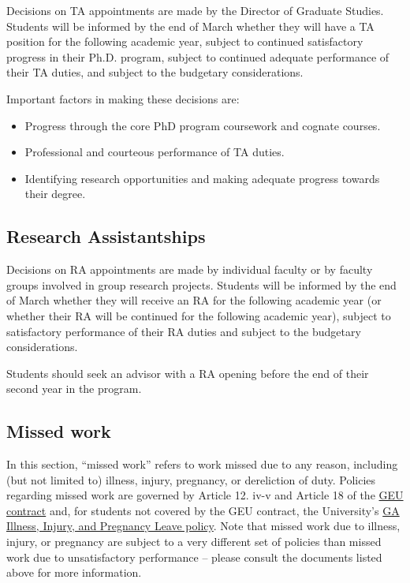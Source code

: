

Decisions on TA appointments are made by the Director of Graduate
Studies.  Students will be informed by the end of March whether they
will have a TA position for the following academic year, subject to
continued satisfactory progress in their Ph.D. program, subject to
continued adequate performance of their TA duties, and subject to the
budgetary considerations.

Important factors in making these decisions are:

\begin{itemize}
\item Progress through the core PhD program coursework and 
cognate courses.
\item Professional and courteous performance of TA duties.
\item Identifying research opportunities and making adequate progress
towards their degree.
\end{itemize}

\subsection{Research Assistantships}

Decisions on RA appointments are made by individual faculty or by
faculty groups involved in group research projects. Students will be
informed by the end of March whether they will receive an RA for the
following academic year (or whether their RA will be continued for
the following academic year), subject to satisfactory performance of
their RA duties and subject to the budgetary considerations.

Students should seek an advisor with a RA opening before the end of
their second year in the program.

\subsection{Missed work}

In this section, ``missed work'' refers to work missed due to any
reason, including (but not limited to) illness, injury, pregnancy, or
dereliction of duty.  Policies regarding missed work are governed by
Article 12. iv-v and Article 18 of the
\href{https://www.hr.msu.edu/documents/contracts/GEU2015-2019.pdf}{GEU
contract} and, for students not covered by the GEU contract, the
University's
\href{https://reg.msu.edu/AcademicPrograms/Text.aspx?Section=111#s351}{GA
Illness, Injury, and Pregnancy Leave policy}.  Note that missed work
due to illness, injury, or pregnancy are subject to a very different
set of policies than missed work due to unsatisfactory performance --
please consult the documents listed above for more information.


